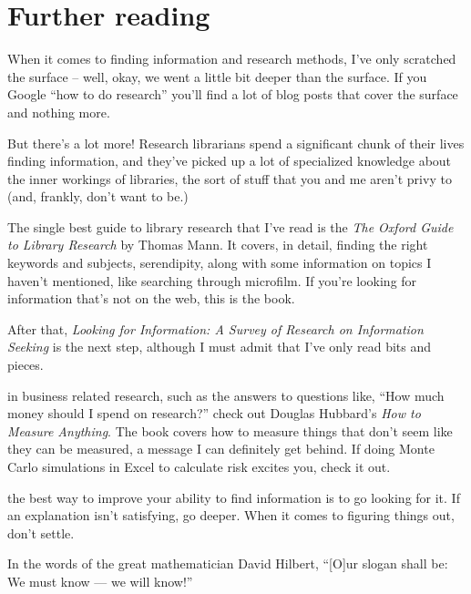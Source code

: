 \section{Further reading}

When it comes to finding information and research methods, I've only scratched
the surface -- well, okay, we went a little bit deeper than the surface. If you
Google ``how to do research'' you'll find a lot of blog posts that cover the
surface and nothing more.

But there's a lot more! Research librarians spend a significant chunk of their
lives finding information, and they've picked up a lot of specialized
knowledge about the inner workings of libraries, the sort of stuff that you and
me aren't privy to (and, frankly, don't want to be.)

The single best guide to library research that I've read is the \textit{The
  Oxford Guide to Library Research} by Thomas Mann. It covers, in detail,
finding the right keywords and subjects, serendipity, along with some
information on topics I haven't mentioned, like searching through
microfilm. If you're looking for information that's not on the web, this is the
book.

After that, \textit{Looking for Information: A Survey of Research on Information
  Seeking} is the next step, although I must admit that I've only read bits and
pieces.

 in business related research, such as the
answers to questions like, ``How much money should I spend on research?'' check
out Douglas Hubbard's \textit{How to Measure Anything}. The book covers how to
measure things that don't seem like they can be measured, a message I can
definitely get behind. If doing Monte Carlo simulations in Excel to calculate
risk excites you, check it out.

 the best way to improve your ability to find
information is to go looking for it. If an explanation isn't satisfying, go
deeper. When it comes to figuring things out, don't settle.

In the words of the great mathematician David Hilbert, ``[O]ur slogan shall be:
We must know — we will know!''

